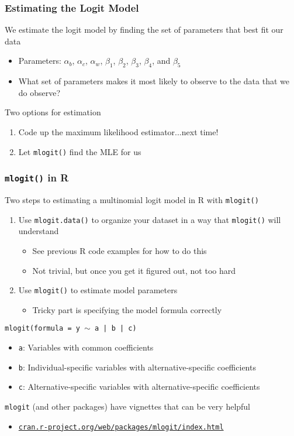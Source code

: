 \documentclass{beamer}
\begin{document}
\begin{frame}\frametitle{Estimating the Logit Model}
    We estimate the logit model by finding the set of parameters that best fit our data
    \begin{itemize}
    	\item Parameters: $\alpha_b$, $\alpha_c$, $\alpha_w$, $\beta_1$, $\beta_2$, $\beta_3$, $\beta_4$, and $\beta_5$
    	\item What set of parameters makes it most likely to observe to the data that we do observe?
    \end{itemize}
    \vspace{3ex}
    Two options for estimation
    \begin{enumerate}
    	\item Code up the maximum likelihood estimator...next time!
    	\item Let \texttt{mlogit()} find the MLE for us
    \end{enumerate}
\end{frame}

\begin{frame}\frametitle{\texttt{mlogit()} in R}
    Two steps to estimating a multinomial logit model in R with \texttt{mlogit()}
    \begin{enumerate}
    	\item Use \texttt{mlogit.data()} to organize your dataset in a way that \texttt{mlogit()} will understand
    	\begin{itemize}
    		\item See previous R code examples for how to do this
    		\item Not trivial, but once you get it figured out, not too hard
    	\end{itemize}
    	\item Use \texttt{mlogit()} to estimate model parameters
    	\begin{itemize}
    		\item Tricky part is specifying the model formula correctly
    	\end{itemize}
    \end{enumerate}
    \vspace{2ex}
    \texttt{mlogit(formula = y $\sim$ a | b | c)}
    \begin{itemize}
    	\item \texttt{a}: Variables with common coefficients
    	\item \texttt{b}: Individual-specific variables with alternative-specific coefficients
    	\item \texttt{c}: Alternative-specific variables with alternative-specific coefficients
    \end{itemize}
    \vspace{2ex}
    \texttt{mlogit} (and other packages) have vignettes that can be very helpful
    \begin{itemize}
    	\item \href{https://cran.r-project.org/web/packages/mlogit/index.html}{\texttt{cran.r-project.org/web/packages/mlogit/index.html}}
    \end{itemize}
\end{frame}
\end{document}
